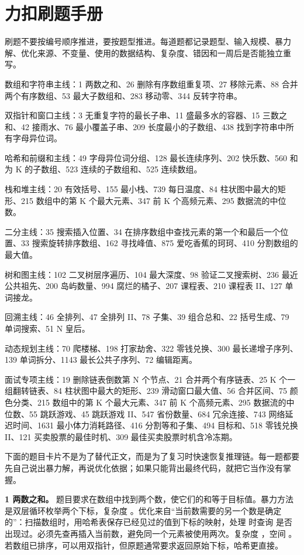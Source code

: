 \chapter{力扣刷题手册}

刷题不要按编号顺序推进，要按题型推进。每道题都记录题型、输入规模、暴力解、优化来源、不变量、使用的数据结构、复杂度、错因和一周后是否能独立重写。

数组和字符串主线：1 两数之和、26 删除有序数组重复项、27 移除元素、88 合并两个有序数组、53 最大子数组和、283 移动零、344 反转字符串。

双指针和窗口主线：3 无重复字符的最长子串、11 盛最多水的容器、15 三数之和、42 接雨水、76 最小覆盖子串、209 长度最小的子数组、438 找到字符串中所有字母异位词。

哈希和前缀和主线：49 字母异位词分组、128 最长连续序列、202 快乐数、560 和为 K 的子数组、523 连续的子数组和、525 连续数组。

栈和堆主线：20 有效括号、155 最小栈、739 每日温度、84 柱状图中最大的矩形、215 数组中的第 K 个最大元素、347 前 K 个高频元素、295 数据流的中位数。

二分主线：35 搜索插入位置、34 在排序数组中查找元素的第一个和最后一个位置、33 搜索旋转排序数组、162 寻找峰值、875 爱吃香蕉的珂珂、410 分割数组的最大值。

树和图主线：102 二叉树层序遍历、104 最大深度、98 验证二叉搜索树、236 最近公共祖先、200 岛屿数量、994 腐烂的橘子、207 课程表、210 课程表 II、127 单词接龙。

回溯主线：46 全排列、47 全排列 II、78 子集、39 组合总和、22 括号生成、79 单词搜索、51 N 皇后。

动态规划主线：70 爬楼梯、198 打家劫舍、322 零钱兑换、300 最长递增子序列、139 单词拆分、1143 最长公共子序列、72 编辑距离。

面试专项主线：19 删除链表倒数第 N 个节点、21 合并两个有序链表、25 K 个一组翻转链表、84 柱状图中最大的矩形、239 滑动窗口最大值、56 合并区间、75 颜色分类、215 数组中的第 K 个最大元素、347 前 K 个高频元素、295 数据流的中位数、55 跳跃游戏、45 跳跃游戏 II、547 省份数量、684 冗余连接、743 网络延迟时间、1631 最小体力消耗路径、416 分割等和子集、494 目标和、518 零钱兑换 II、121 买卖股票的最佳时机、309 最佳买卖股票时机含冷冻期。

下面的题目卡片不是为了替代正文，而是为了复习时快速恢复推理链。每一题都要先自己说出暴力解，再说优化依据；如果只能背出最终代码，就把它当作没有掌握。

\textbf{1 两数之和。} 题目要求在数组中找到两个数，使它们的和等于目标值。暴力方法是双层循环枚举两个下标，复杂度 。优化来自“当前数需要的另一个数是确定的”：扫描数组时，用哈希表保存已经见过的值到下标的映射，处理  时查询  是否出现过。必须先查再插入当前数，避免同一个元素被使用两次。复杂度 ，空间 。若数组已排序，可以用双指针，但原题通常要求返回原始下标，哈希更直接。

